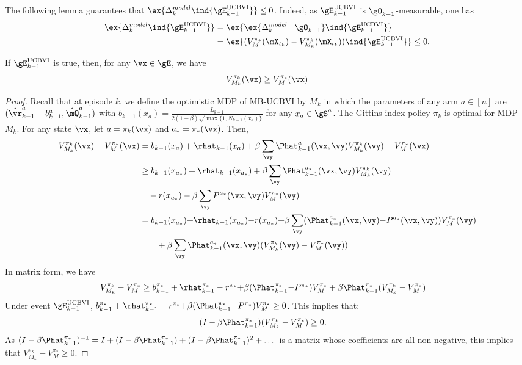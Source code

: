 \begin{subappendices}
The following lemma guarantees that $\ex{\Delta^{model}_k \ind{\gE_{k-1}^\text{UCBVI}}}\le0$. Indeed, as $\gE_{k-1}^\text{UCBVI}$ is $\gO_{k-1}$-measurable, one has 
\begin{align*}
    \ex{\Delta^{model}_k\ind{\gE_{k-1}^\text{UCBVI}}} &= \ex{\ex{\Delta^{model}_k\mid \gO_{k-1}}\ind{\gE_{k-1}^\text{UCBVI}}}\\
    &=\ex{(V_M^{\pi_*}(\mX_{t_k}) - V_{M_k}^{\pi_k}(\mX_{t_k}))\ind{\gE_{k-1}^\text{UCBVI}}} \le 0.
\end{align*}
\begin{lem}
    \label{lem:ucbvi_optim}
   If $\gE_{k-1}^\text{UCBVI}$ is true, then, for any $\vx\in\gE$, we have
   \begin{align*}
       V_{M_k}^{\pi_k}(\vx) \ge V_{M}^{\pi_*}(\vx)
    \end{align*}
\end{lem}
\begin{proof}
    Recall that at episode $k$, we define the optimistic MDP of MB-UCBVI by $M_k$ in which the parameters of any arm $a\in[n]$ are $(\hat{\vr}_{k-1}^a +b_{k-1}^a, \hat{\mQ}_{k-1}^a)$ with $b_{k-1}(x_a){=}\frac{L_{k-1}}{2(1-\beta)\sqrt{\max\{1,N_{k-1}(x_a)\} }}$ for any $x_a\in\gS^a$.
The Gittins index policy $\pi_k$ is optimal for MDP $M_k$.
For any state $\vx$, let $a=\pi_k(\vx)$ and $a_*=\pi_*(\vx)$.
Then,
\begin{align*}
    V_{M_k}^{\pi_k}(\vx) -V_M^{\pi_*}(\vx)
    &= b_{k-1}(x_a) +\rhat_{k-1}(x_a) +\beta\sum_{\vy}\Phat_{k-1}^{a}(\vx,\vy)V_{M_k}^{\pi_k}(\vy) -V_M^{\pi_*}(\vx)\\ 
    &\ge b_{k-1}(x_{a_*}) +\rhat_{k-1}(x_{a_*}) +\beta\sum_{\vy}\Phat_{k-1}^{a_*}(\vx,\vy)V_{M_k}^{\pi_k}(\vy) \\
    &\quad -r(x_{a_*}) -\beta\sum_{\vy}P^{a_*}(\vx,\vy)V_M^{\pi_*}(\vy) \\
    &= b_{k-1}(x_{a_*}) {+}\rhat_{k-1}(x_{a_*}) {-}r(x_{a_*}) {+}\beta\sum_{\vy}(\Phat_{k-1}^{a_*}(\vx,\vy) {-}P^{a_*}(\vx,\vy))V_M^{\pi_*}(\vy) \\
    &\qquad +\beta \sum_{\vy}\Phat_{k-1}^{a_*}(\vx,\vy)(V_{M_k}^{\pi_k}(\vy) -V_M^{\pi_*}(\vy))
\end{align*}
In matrix form, we have
\begin{align*}
    V_{M_k}^{\pi_k} -V_M^{\pi_*}
    &\ge b_{k-1}^{\pi_*} +\rhat^{\pi_*}_{k-1} -r^{\pi_*} {+}\beta(\Phat_{k-1}^{\pi_*} {-}P^{\pi_*})V_M^{\pi_*} +\beta \Phat_{k-1}^{\pi_*}(V_{M_k}^{\pi_k} -V_M^{\pi_*})
\end{align*}
Under event $\gE_{k-1}^\text{UCBVI}$, $b_{k-1}^{\pi_*} +\rhat^{\pi_*}_{k-1} -r^{\pi_*} {+}\beta(\Phat_{k-1}^{\pi_*} {-}P^{\pi_*})V_M^{\pi_*}\ge 0$. This implies that:
\begin{align*}
    (I-\beta \Phat_{k-1}^{\pi_*})(V_{M_k}^{\pi_k} -V_M^{\pi_*}) &\ge 0.
\end{align*}
As $(I-\beta \Phat_{k-1}^{\pi_*})^{-1} = I+ (I-\beta \Phat_{k-1}^{\pi_*}) +(I-\beta \Phat_{k-1}^{\pi_*})^2 +\dots$ is a matrix whose coefficients are all non-negative, this implies that $V_{M_k}^{\pi_k} -V_M^{\pi_*} \ge 0$. 
\end{proof}


\end{subappendices}
